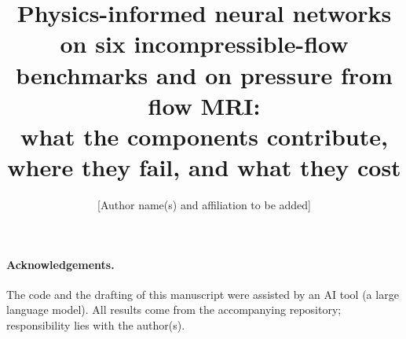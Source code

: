 \documentclass[10pt,twocolumn]{article}
\title{\Large Physics-informed neural networks on six incompressible-flow benchmarks and on pressure from flow MRI:\\
what the components contribute, where they fail, and what they cost}
\author{[Author name(s) and affiliation to be added]}
\date{}
\begin{document}
\maketitle

\begin{abstract}

\end{abstract}








\paragraph{Acknowledgements.} The code and the drafting of this manuscript were assisted by an AI tool (a large
language model). All results come from the accompanying repository; responsibility lies with the author(s).



\end{document}
